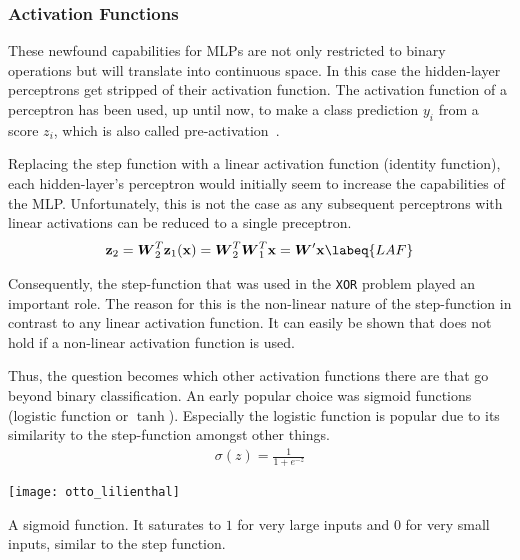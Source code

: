 
\subsubsection{Activation Functions}
These newfound capabilities for MLPs are not only restricted to binary operations but will translate into continuous space.
In this case the hidden-layer perceptrons get stripped of their activation function.
The activation function of a perceptron has been used, up until now, to make a class prediction $y_i$ from a score $z_i$, which is also called pre-activation~\cite[p.~6]{GrosseNotes}.

Replacing the step function with a linear activation function (\ie identity function), each hidden-layer's perceptron would initially seem to increase the capabilities of the MLP.
Unfortunately, this is not the case as any subsequent perceptrons with linear activations can be reduced to a single preceptron.
\begin{align}
    \vec{z}_2 = \mat{W}^T_2 \vec{z}_1(\vec{x}) = \mat{W}^T_2 \mat{W}^T_1 \vec{x} = \mat{W}' \vec{x}
    \labeq{LAF}
\end{align}

Consequently, the step-function that was used in the \lstinline|XOR| problem played an important role.
The reason for this is the non-linear nature of the step-function in contrast to any linear activation function.
It can easily be shown that  does not hold if a non-linear activation function is used.

Thus, the question becomes which other activation functions there are that go beyond binary classification.
An early popular choice was sigmoid functions (logistic function or $\tanh$).
Especially the logistic function is popular due to its similarity to the step-function amongst other things.
\begin{align}
    \sigma(z) = \frac{1}{1 + e^{-z}}
\end{align}
\begin{marginfigure}
    \texttt{[image: otto\_lilienthal]}
    \caption[]{A sigmoid function. It saturates to $1$ for very large inputs and $0$ for very small inputs, similar to the step function.}
\end{marginfigure}

